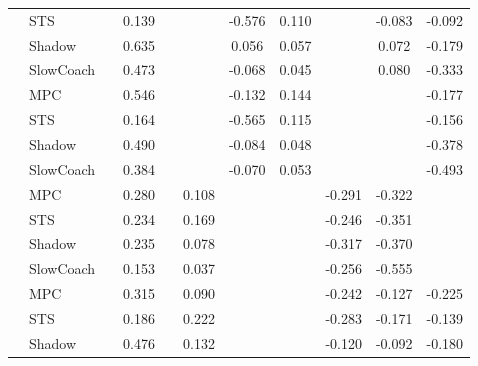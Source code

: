 \begin{tabular}{|l|l|*{9}{c|}}
                                                           & STS &       &     0.139 &        &     & -0.576 &  0.110 &      &  -0.083 &   -0.092 \\
                                                           & Shadow &       &     0.635 &        &     &  0.056 &  0.057 &      &   0.072 &   -0.179 \\
                                                           & SlowCoach &       &     0.473 &        &     & -0.068 &  0.045 &      &   0.080 &   -0.333 \\
\midrule
[False, True, False, False, True, True, False, False, True] & MPC &       &     0.546 &        &     & -0.132 &  0.144 &      &      &   -0.177 \\
                                                           & STS &       &     0.164 &        &     & -0.565 &  0.115 &      &      &   -0.156 \\
                                                           & Shadow &       &     0.490 &        &     & -0.084 &  0.048 &      &      &   -0.378 \\
                                                           & SlowCoach &       &     0.384 &        &     & -0.070 &  0.053 &      &      &   -0.493 \\
\midrule
[False, True, False, True, False, False, True, True, False] & MPC &       &     0.280 &        &  0.108 &     &     &  -0.291 &  -0.322 &       \\
                                                           & STS &       &     0.234 &        &  0.169 &     &     &  -0.246 &  -0.351 &       \\
                                                           & Shadow &       &     0.235 &        &  0.078 &     &     &  -0.317 &  -0.370 &       \\
                                                           & SlowCoach &       &     0.153 &        &  0.037 &     &     &  -0.256 &  -0.555 &       \\
\midrule
[False, True, False, True, False, False, True, True, True] & MPC &       &     0.315 &        &  0.090 &     &     &  -0.242 &  -0.127 &   -0.225 \\
                                                           & STS &       &     0.186 &        &  0.222 &     &     &  -0.283 &  -0.171 &   -0.139 \\
                                                           & Shadow &       &     0.476 &        &  0.132 &     &     &  -0.120 &  -0.092 &   -0.180 \\

\end{tabular}
